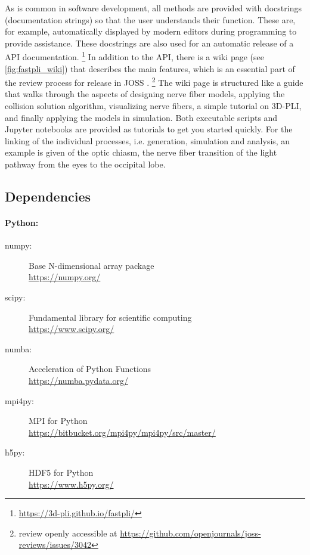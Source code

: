 %
As is common in software development, all methods are provided with docstrings (documentation strings) so that the user understands their function.
These are, for example, automatically displayed by modern editors during programming to provide assistance.
These docstrings are also used for an automatic release of a \ac{API} documentation.
\footnote{\url{https://3d-pli.github.io/fastpli/}}
In addition to the API, there is a wiki page (see \cref{fig:fastpli_wiki}) that describes the main features, which is an essential part of the review process for release in \ac{JOSS} \cite{Matuschke2021}. 
\footnote{review openly accessible at \url{https://github.com/openjournals/joss-reviews/issues/3042}}
The wiki page is structured like a guide that walks through the aspects of designing nerve fiber models, applying the collision solution algorithm, visualizing nerve fibers, a simple tutorial on \ac{3D-PLI}, and finally applying the models in simulation.
Both executable \python{} scripts and Jupyter notebooks are provided as tutorials to get you started quickly.
For the linking of the individual processes, i.e. generation, simulation and analysis, an example is given of the optic chiasm, the nerve fiber transition of the light pathway from the eyes to the occipital lobe.
%
%
%
\subsection{Dependencies}
%
\paragraph{Python:}
\begin{description}
\item[numpy:] Base N-dimensional array package \cite{2019arXiv190710121V}\\
\url{https://numpy.org/}
\item[scipy:] Fundamental library for scientific computing \cite{2019arXiv190710121V}\\
\url{https://www.scipy.org/}
\item[numba:] Acceleration of Python Functions \cite{Lam2015}\\
\url{https://numba.pydata.org/}
\item[mpi4py:] MPI for Python \cite{Dalcn2005, Dalcn2008, Dalcin2011}\\
\url{https://bitbucket.org/mpi4py/mpi4py/src/master/}
\item[h5py:] HDF5 for Python \cite{collette_python_hdf5_2014, hdf5}\\
\url{https://www.h5py.org/}
\end{description}
%
